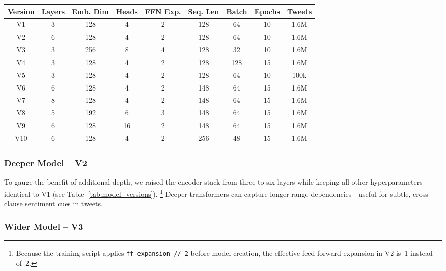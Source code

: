 \documentclass[twocolumn,superscriptaddress,aps]{revtex4-1}
\begin{document}
\begin{table*}[t]
\centering
\renewcommand{\arraystretch}{0.1}
\begin{tabular}{|c|c|c|c|c|c|c|c|c|}
\hline
\textbf{Version} & \textbf{Layers} & \textbf{Emb. Dim} & \textbf{Heads} & \textbf{FFN Exp.} & \textbf{Seq. Len} & \textbf{Batch} & \textbf{Epochs} & \textbf{Tweets} \\
\hline
V1  & 3 & 128 & 4  & 2 & 128 & 64  & 10 & 1.6M \\
V2  & 6 & 128 & 4  & 2 & 128 & 64  & 10 & 1.6M \\
V3  & 3 & 256 & 8  & 4 & 128 & 32  & 10 & 1.6M \\
V4  & 3 & 128 & 4  & 2 & 128 & 128 & 15 & 1.6M \\
V5  & 3 & 128 & 4  & 2 & 128 & 64  & 10 & 100k \\
V6  & 6 & 128 & 4  & 2 & 148 & 64  & 15 & 1.6M \\
V7  & 8 & 128 & 4  & 2 & 148 & 64  & 15 & 1.6M \\
V8  & 5 & 192 & 6  & 3 & 148 & 64  & 15 & 1.6M \\
V9  & 6 & 128 & 16 & 2 & 148 & 64  & 15 & 1.6M \\
V10 & 6 & 128 & 4  & 2 & 256 & 48  & 15 & 1.6M \\
\hline
\end{tabular}
\renewcommand{\arraystretch}{1}
\caption{Main architecture, training settings, and dataset size for all model versions.}
\label{tab:model_versions}
\end{table*}

\subsubsection{Deeper Model -- V2}

To gauge the benefit of additional depth, we raised the encoder stack from three to six layers while keeping all other hyperparameters identical to V1 (see Table~\ref{tab:model_versions}).%
\footnote{Because the training script applies \texttt{ff\_expansion // 2} before model creation, the effective feed-forward expansion in V2 is~1 instead of~2.}
Deeper transformers can capture longer‐range dependencies—useful for subtle, cross-clause sentiment cues in tweets.

\subsubsection{Wider Model -- V3}
\end{document}
